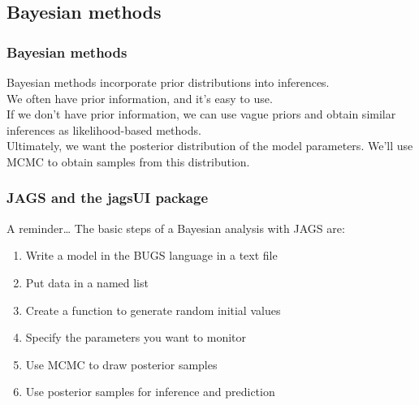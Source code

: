 \documentclass[color=usenames,dvipsnames]{beamer}\usepackage[]{graphicx}\usepackage[]{xcolor}
\begin{document}
\subsection{Bayesian methods}


\begin{frame}
  \frametitle{Bayesian methods}
  Bayesian methods incorporate prior distributions into inferences. \\
  \pause
  \vfill
  We often have prior information, and it's easy to use. \\
  \pause
  \vfill
  If we don't have prior information, we can use vague priors and
  obtain similar inferences as likelihood-based methods. \\
  \pause
  \vfill
  Ultimately, we want the posterior distribution of the model
  parameters. We'll use MCMC to obtain samples from this
  distribution. 
\end{frame}




\begin{frame}
  \frametitle{JAGS and the jagsUI package}
  A reminder\dots
  \vfill
  The basic steps of a Bayesian analysis with JAGS are:
  \begin{enumerate}%
    \item Write a model in the BUGS language in a text file
    \item Put data in a named list
    \item Create a function to generate random initial values
    \item Specify the parameters you want to monitor
    \item Use MCMC to draw posterior samples
    \item Use posterior samples for inference and prediction
  \end{enumerate}
\end{frame}
\end{document}
